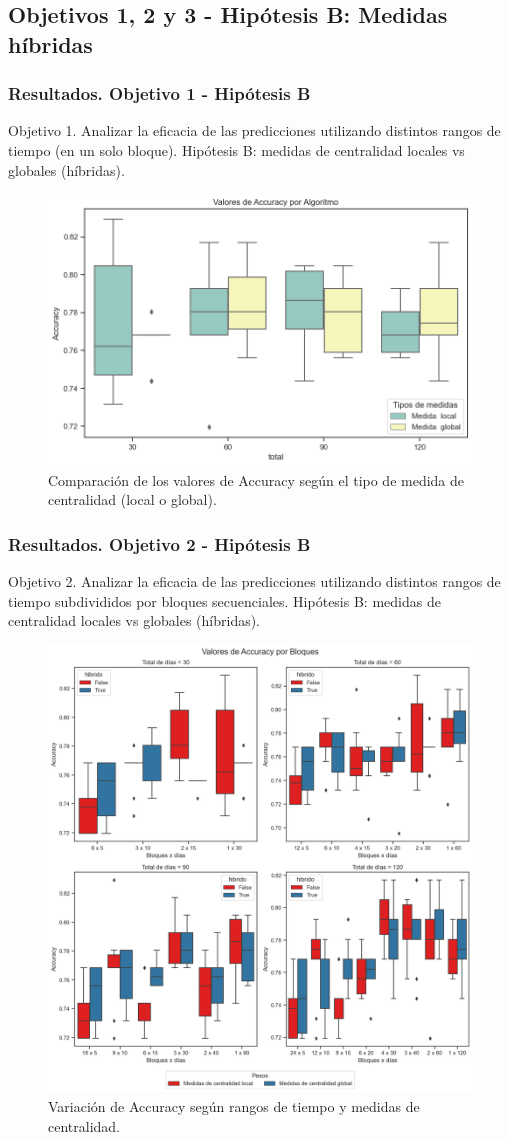 \documentclass{beamer}
\begin{document}
\subsection{Objetivos 1, 2 y 3 - Hipótesis B: Medidas híbridas}
\begin{frame}
	\frametitle{Resultados. Objetivo 1 - Hipótesis B}
	\begin{block}{Objetivo 1. Analizar la eficacia de las predicciones utilizando distintos rangos de tiempo (en un solo bloque).}
		Hipótesis B: medidas de centralidad locales vs globales (híbridas).
	\end{block}
	
\begin{figure}[H]
	\centering
	\includegraphics[width=0.7\linewidth]{figs/cap6/figura_24}
	\caption{Comparación de los valores de Accuracy según el tipo de medida de centralidad (local o global).}
	\label{fig:figura24}
\end{figure}
\end{frame}

\begin{frame}
	\frametitle{Resultados. Objetivo 2 - Hipótesis B}
	\begin{block}{Objetivo 2. Analizar la eficacia de las predicciones utilizando distintos rangos de tiempo subdivididos por bloques secuenciales.}
		Hipótesis B: medidas de centralidad locales vs globales (híbridas).
	\end{block}
	

\begin{figure}[H]
	\centering
	\includegraphics[width=0.45\linewidth]{figs/cap6/figura_47}
	\caption{Variación de Accuracy según rangos de tiempo y medidas de centralidad.}
	
	\label{fig:figura647}
\end{figure}
	
\end{frame}
\end{document}
